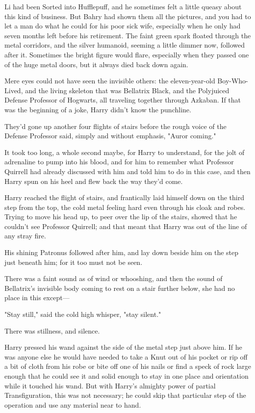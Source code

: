Li had been Sorted into Hufflepuff, and he sometimes felt a little queasy about
this kind of business. But Bahry had shown them all the pictures, and you had
to let a man do what he could for his poor sick wife, especially when he only
had seven months left before his retirement.
\sbreak
The faint green spark floated through the metal corridors, and the silver
humanoid, seeming a little dimmer now, followed after it. Sometimes the bright
figure would flare, especially when they passed one of the huge metal doors,
but it always died back down again.

Mere eyes could not have seen the invisible others: the eleven-year-old
Boy-Who-Lived, and the living skeleton that was Bellatrix Black, and the
Polyjuiced Defense Professor of Hogwarts, all traveling together through
Azkaban. If that was the beginning of a joke, Harry didn't know the punchline.

They'd gone up another four flights of stairs before the rough voice of the
Defense Professor said, simply and without emphasis, "Auror coming."

It took too long, a whole second maybe, for Harry to understand, for the jolt
of adrenaline to pump into his blood, and for him to remember what Professor
Quirrell had already discussed with him and told him to do in this case, and
then Harry spun on his heel and flew back the way they'd come.

Harry reached the flight of stairs, and frantically laid himself down on the
third step from the top, the cold metal feeling hard even through his cloak and
robes. Trying to move his head up, to peer over the lip of the stairs, showed
that he couldn't see Professor Quirrell; and that meant that Harry was out of
the line of any stray fire.

His shining Patronus followed after him, and lay down beside him on the step
just beneath him; for it too must not be seen.

There was a faint sound as of wind or whooshing, and then the sound of
Bellatrix's invisible body coming to rest on a stair further below, she had no
place in this except—

"Stay still," said the cold high whisper, "stay silent."

There was stillness, and silence.

Harry pressed his wand against the side of the metal step just above him. If he
was anyone else he would have needed to take a Knut out of his pocket{\el}
or rip off a bit of cloth from his robe{\el} or bite off one of his
nails{\el} or find a speck of rock large enough that he could see it and
solid enough to stay in one place and orientation while it touched his wand.
But with Harry's almighty power of partial Transfiguration, this was not
necessary; he could skip that particular step of the operation and use any
material near to hand.

